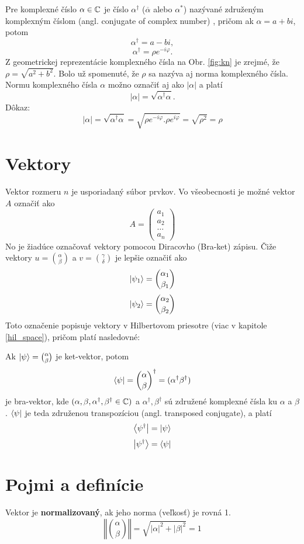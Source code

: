 Pre komplexné číslo \(\alpha \in \mathbb{C}\) je číslo \(\alpha^{\dag}\) (\(\overline{\alpha}\) alebo \(\alpha^{*}\)) nazývané združeným komplexným číslom (angl. conjugate of complex number) \cite{Tit06}, pričom ak \(\alpha = a + bi\), potom 
\[\alpha^{\dag} = a - bi,\] 
\[\alpha^{\dag} = \rho e^{-i\varphi}.\]
Z geometrickej reprezentácie komplexného čísla na Obr. \ref{fig:kn} je zrejmé, že \(\rho = \sqrt{a^2 + b^2}\).
Bolo už spomenuté, že \(\rho\) sa nazýva aj norma komplexného čísla.
Normu komplexného čísla \(\alpha\) možno označiť aj ako \(|\alpha|\) a platí
\[|\alpha| = \sqrt{\alpha^{\dag}\alpha}.\]
Dôkaz:
\[|\alpha| = \sqrt{\alpha^{\dag}\alpha} = \sqrt{\rho e^{-i\varphi}.\rho e^{i\varphi}} = \sqrt{\rho^{2}} = \rho\]

\section{Vektory}

Vektor rozmeru \(n\) je usporiadaný súbor prvkov.
Vo všeobecnosti je možné vektor \(A\) označiť ako 
\[A = \begin{pmatrix}
		a_{1} \\
		a_{2}\\
		\dots \\
		a_{n}
     \end{pmatrix}\]
No je žiadúce označovať vektory pomocou Diracovho (Bra-ket) zápisu.
Čiže vektory \(u = \binom{\alpha}{\beta}\) a \(v = \binom{\gamma}{\delta}\) je lepšie označiť ako 
\[\Ket{\psi_1} = \binom{\alpha_1}{\beta_1}\]
\[\Ket{\psi_2} = \binom{\alpha_2}{\beta_2}\]
Toto označenie popisuje vektory v Hilbertovom priesotre (viac v kapitole \ref{hil_space}), pričom platí nasledovné:

Ak \(\Ket{\psi} = \binom{\alpha}{\beta}\) je ket-vektor, potom 
\[\Bra{\psi} = {\binom{\alpha}{\beta}}^{\dag} = (\alpha^{\dag} \beta^{\dag})\]
je  bra-vektor, kde \( ( \alpha, \beta, \alpha^{\dag}, \beta^{\dag} \in \mathbb{C} ) \) a \(\alpha^{\dag}, \beta^{\dag}\) sú združené komplexné čísla ku \(\alpha\) a \(\beta\).
\(\Bra{\psi}\) je teda združenou transpozíciou (angl. transposed conjugate), a platí
\[\Bra{\psi^{\dag}} = \Ket{\psi}\]
\[\Ket{\psi^{\dag}} = \Bra{\psi}\]


\section{Pojmi a definície}
Vektor je \textbf{normalizovaný}, ak jeho norma (veľkosť) je rovná 1.
\[\left\Vert \binom{\alpha}{\beta} \right\Vert = \sqrt{|\alpha|^2 + |\beta|^2}= 1\]

